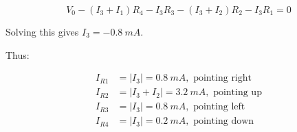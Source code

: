 \documentclass[12pt]{article}
\begin{document}
\begin{equation}
    V_{0} - (I_{3} + I_{1}) R_{4} - I_{3} R_{3} - (I_{3} + I_{2}) R_{2} - I_{3} R_{1} = 0
\end{equation}

Solving this gives $I_{3} = \qty{-0.8}{mA}$.

Thus:

\begin{equation}
\begin{split}
    I_{R1} &= \left\lvert I_{3} \right\rvert = \qty{0.8}{mA}, \text{ pointing right} \\
    I_{R2} &= \left\lvert I_{3} + I_{2} \right\rvert = \qty{3.2}{mA}, \text{ pointing up} \\
    I_{R3} &= \left\lvert I_{3} \right\rvert = \qty{0.8}{mA}, \text{ pointing left} \\
    I_{R4} &= \left\lvert I_{3} \right\rvert = \qty{0.2}{mA}, \text{ pointing down}
\end{split}
\end{equation}
\end{document}
